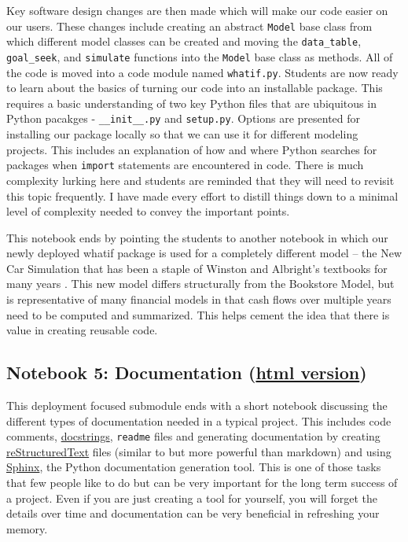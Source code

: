 \documentclass[ited,blindrev]{informs3}              %
\newcommand{\code}[1]{\texttt{#1}}
\begin{document}
Key software design changes are then made which will make our code easier on our users. These changes include creating an abstract \code{Model} base class from which different model classes can be created and moving the \code{data\_table}, \code{goal\_seek}, and \code{simulate} functions into the \code{Model} base class as methods. All of the code is moved into a code module named \code{whatif.py}. Students are now ready to learn about the basics of turning our code into an installable package. This requires a basic understanding of two key Python files that are ubiquitous in Python pacakges - \code{\_\_init\_\_.py} and \code{setup.py}. Options are presented for installing our package locally so that we can use it for different modeling projects. This includes an explanation of how and where Python searches for packages when \code{import} statements are encountered in code. There is much complexity lurking here and students are reminded that they will need to revisit this topic frequently. I have made every effort to distill things down to a minimal level of complexity needed to convey the important points.

This notebook ends by pointing the students to another notebook in which our newly deployed whatif package is used for a completely different model -- the New Car Simulation that has been a staple of Winston and Albright's textbooks for many years \cite{winstonPracticalManagementScience2018,albrightBusinessAnalyticsData2016}. This new model differs structurally from the Bookstore Model, but is representative of many financial models in that cash flows over multiple years need to be computed and summarized. This helps cement the idea that there is value in creating reusable code.

\subsection{Notebook 5: Documentation (\href{http://www.sba.oakland.edu/faculty/isken/excel_with_python/what_if_5_documentation.html}{html version})}

This deployment focused submodule ends with a short notebook discussing the different types of documentation needed in a typical project. This includes code comments, \href{https://peps.python.org/pep-0257/}{docstrings}, \code{readme} files and generating documentation by creating \href{https://www.sphinx-doc.org/en/master/usage/restructuredtext/basics.html}{reStructuredText} files (similar to but more powerful than markdown) and using \href{https://www.sphinx-doc.org/en/master/index.html}{Sphinx}, the Python documentation generation tool. This is one of those tasks that few people like to do but can be very important for the long term success of a project. Even if you are just creating a tool for yourself, you will forget the details over time and documentation can be very beneficial in refreshing your memory. 
\end{document}

